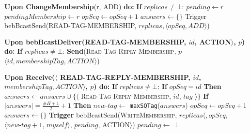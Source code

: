 \documentclass[10pt,a4paper,twocolumn]{article}
\begin{document}
\begin{algorithm}
	\caption{Membership Management - Join \& Remove}
	\begin{algorithmic}
		\State \textbf{Upon ChangeMembership}(r, ADD) \textbf{do:}
		\State \hspace{1em} \textbf{If} \textsc{$replicas \neq \bot$}:
		\State \hspace{3em} $pending \leftarrow r$
		\State \hspace{3em} $pendingMembership \leftarrow r$
		\State \hspace{3em} $opSeq \leftarrow opSeq + 1$
		\State \hspace{3em} $answers \leftarrow \{\}$
		\State \hspace{3em} Trigger bebBcastSend(READ-TAG-MEMBERSHIP, $replicas, \langle opSeq, ADD\rangle$)
		\State

		\State \textbf{Upon bebBcastDeliver(READ-TAG-MEMBERSHIP, $id$, ACTION$\rangle$, $p$) do:}
		\State \hspace{1em} \textbf{If} \textsc{$replicas \neq \bot$}:
		\State \hspace{3em} \textbf{Send}(\textsc{Read-Tag-Reply-Membership}, $p$ $\langle id, membershipTag, ACTION\rangle$)
		\State

		\State \textbf{Upon Receive($\langle$ READ-TAG-REPLY-MEMBERSHIP, $id$, $membershipTag$$, ACTION\rangle$, $p$) do:}
		\State \hspace{1em} \textbf{If} \textsc{$replicas \neq \bot$}:
		\State \hspace{3em} \textbf{If} $opSeq = id$ \textbf{Then}
		\State \hspace{4em} $answers \leftarrow answers \cup \{\langle$ \textsc{Read-Tag-Reply-Membership}, $id$, $tag$ $\rangle\}$
		\State \hspace{4em} \textbf{If} $|answers| = \frac{\#\Pi+1}{2} + 1$ \textbf{Then}
		\State \hspace{5em} $new\text{-}tag \leftarrow$ \texttt{maxSQTag}($answers$)
		\State \hspace{5em} $opSeq \leftarrow opSeq + 1$
		\State \hspace{5em} $answers \leftarrow \{\}$
		\State \hspace{5em} \textbf{Trigger} bebBcastSend(\textsc{WriteMembership}, $replicas \langle, opSeq$, $\langle new\text{-}tag + 1$, $myself \rangle$, $pending$, ACTION$\rangle$)
		\State \hspace{5em} $pending \leftarrow \perp$
		\State


\end{algorithmic}
\end{algorithm}
\end{document}
